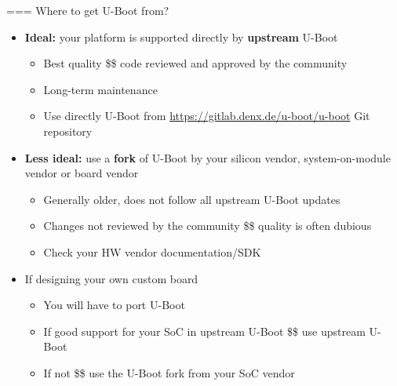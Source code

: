 === {Where to get U-Boot from?}
  \begin{itemize}
  \item {\bf Ideal:} your platform is supported directly by {\bf
      upstream} U-Boot
    \begin{itemize}
    \item Best quality \$\rightarrow\$ code reviewed and approved by the community
    \item Long-term maintenance
    \item Use directly U-Boot from
      \url{https://gitlab.denx.de/u-boot/u-boot} Git repository
    \end{itemize}
  \item {\bf Less ideal:} use a {\bf fork} of U-Boot by your silicon
    vendor, system-on-module vendor or board vendor
    \begin{itemize}
    \item Generally older, does not follow all upstream U-Boot updates
    \item Changes not reviewed by the community \$\rightarrow\$ quality
      is often dubious
    \item Check your HW vendor documentation/SDK
    \end{itemize}
  \item If designing your own custom board
    \begin{itemize}
    \item You will have to port U-Boot
    \item If good support for your SoC in upstream U-Boot
      \$\rightarrow\$ use upstream U-Boot
    \item If not \$\rightarrow\$ use the U-Boot fork from your SoC
      vendor
    \end{itemize}
  \end{itemize}



